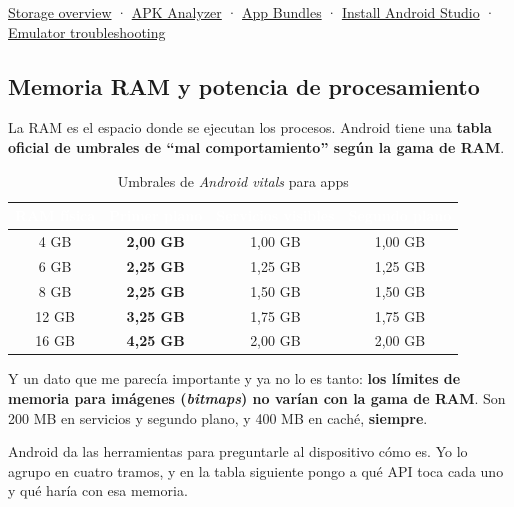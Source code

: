 \begin{fuentesbox}
\href{https://developer.android.com/training/data-storage}{Storage overview} ·
\href{https://developer.android.com/studio/debug/apk-analyzer}{APK Analyzer} ·
\href{https://developer.android.com/guide/app-bundle/dynamic-delivery}{App Bundles} ·
\href{https://developer.android.com/studio/install}{Install Android Studio} ·
\href{https://developer.android.com/studio/run/emulator-troubleshooting}{Emulator troubleshooting}
\end{fuentesbox}

\subsection{Memoria RAM y potencia de procesamiento}

La RAM es el espacio donde se ejecutan los procesos. Android tiene una \textbf{tabla oficial de umbrales de \enquote{mal comportamiento} según la gama de RAM}.

\begin{table}[htbp]
\centering
\small
\begin{tabular}{@{}c c c c@{}}
\toprule
\rowcolor{primary}
\textcolor{white}{\sffamily\bfseries RAM física} & \textcolor{white}{\sffamily\bfseries Primer plano} & \textcolor{white}{\sffamily\bfseries Servicios visibles} & \textcolor{white}{\sffamily\bfseries Segundo plano} \\
\midrule
4 GB & \textbf{2,00 GB} & 1,00 GB & 1,00 GB \\
\rowcolor{soft}
6 GB & \textbf{2,25 GB} & 1,25 GB & 1,25 GB \\
8 GB & \textbf{2,25 GB} & 1,50 GB & 1,50 GB \\
\rowcolor{soft}
12 GB & \textbf{3,25 GB} & 1,75 GB & 1,75 GB \\
16 GB & \textbf{4,25 GB} & 2,00 GB & 2,00 GB \\
\bottomrule
\end{tabular}
\caption{Umbrales de \emph{Android vitals} para apps}
\end{table}

Y un dato que me parecía importante y ya no lo es tanto: \textbf{los límites de memoria para imágenes (\emph{bitmaps}) no varían con la gama de RAM}. Son 200 MB en servicios y segundo plano, y 400 MB en caché, \textbf{siempre}.

Android da las herramientas para preguntarle al dispositivo cómo es. Yo lo agrupo en cuatro tramos, y en la tabla siguiente pongo a qué API toca cada uno y qué haría con esa memoria.

